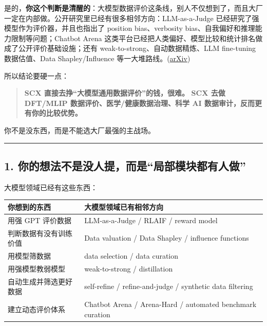 \documentclass[
  12pt,
]{ctexart}
\begin{document}
是的，\textbf{你这个判断是清醒的}：大模型数据评价这条线，别人不仅想到了，而且大厂一定在内部做。公开研究里已经有很多相邻方向：LLM-as-a-Judge
已经研究了强模型作为评价器，并且也指出了 position bias、verbosity
bias、自我偏好和推理能力限制等问题；Chatbot Arena
这类平台已经把人类偏好、模型比较和统计排名做成了公开评价基础设施；还有
weak-to-strong、自动数据精炼、LLM fine-tuning 数据估值、Data
Shapley/Influence
等一大堆路线。(\href{https://arxiv.org/html/2406.17557v1?utm_source=chatgpt.com}{arXiv})

所以结论要硬一点：

\begin{quote}
\textbf{SCX 直接去挣``大模型通用数据评价''的钱，很难。} \textbf{SCX 去做
DFT/MLIP 数据评价、医学/健康数据治理、科学 AI
数据审计，反而更有你的比较优势。}
\end{quote}

你不是没东西，而是不能选大厂最强的主战场。

\begin{center}\rule{0.5\linewidth}{0.5pt}\end{center}

\subsection{1.
你的想法不是没人提，而是``局部模块都有人做''}\label{ux4f60ux7684ux60f3ux6cd5ux4e0dux662fux6ca1ux4ebaux63d0ux800cux662fux5c40ux90e8ux6a21ux5757ux90fdux6709ux4ebaux505a}

大模型领域已经有这些东西：

\begin{longtable}[]{@{}
  >{\raggedright\arraybackslash}p{}
  >{\raggedright\arraybackslash}p{}@{}}
\toprule\noalign{}
\begin{minipage}[b]{\linewidth}\raggedright
你想到的东西
\end{minipage} & \begin{minipage}[b]{\linewidth}\raggedright
大模型领域已有相邻方向
\end{minipage} \\
\midrule\noalign{}
\endhead
\bottomrule\noalign{}
\endlastfoot
用强 GPT 评价数据 & LLM-as-a-Judge / RLAIF / reward model \\
判断数据有没有训练价值 & Data valuation / Data Shapley / influence
functions \\
用模型筛数据 & data selection / data curation \\
用强模型教弱模型 & weak-to-strong / distillation \\
自动生成并筛选更好数据 & self-refine / refine-and-judge / synthetic data
filtering \\
建立动态评价体系 & Chatbot Arena / Arena-Hard / automated benchmark
curation \\
\end{longtable}
\end{document}
